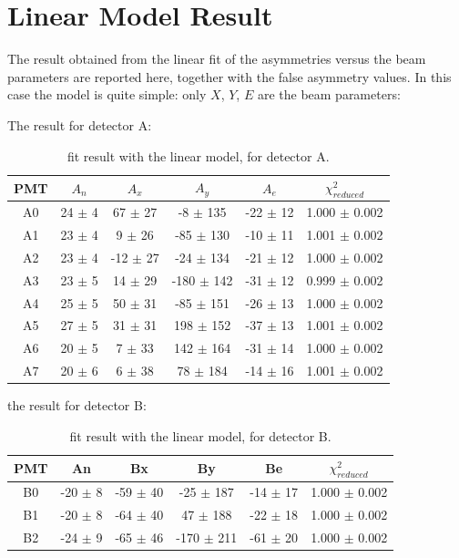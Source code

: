 \newpage
\section{Linear Model Result}
The result obtained from the linear fit of the asymmetries versus the beam parameters are reported here, together with the false asymmetry values. In this case the model is quite simple: only $X$, $Y$, $E$ are the beam parameters:

The result for detector A:
\begin{table}[h] 
\centering
\begin{tabular}{c|c|c|c|c|c}
\hline
 PMT   & $A_{n}$    & $A_{x}$          & $A_{y}$            & $A_{e}$         & $\chi^{2}_{reduced}$ \\
\hline
 A0    & 24 $\pm$ 4 & 67 $\pm$ 27  & -8 $\pm$ 135   & -22 $\pm$ 12 & 1.000 $\pm$ 0.002   \\
 A1    & 23 $\pm$ 4 & 9 $\pm$ 26   & -85 $\pm$ 130  & -10 $\pm$ 11 & 1.001 $\pm$ 0.002 \\
 A2    & 23 $\pm$ 4 & -12 $\pm$ 27 & -24 $\pm$ 134  & -21 $\pm$ 12 & 1.000 $\pm$ 0.002   \\
 A3    & 23 $\pm$ 5 & 14 $\pm$ 29  & -180 $\pm$ 142 & -31 $\pm$ 12 & 0.999 $\pm$ 0.002 \\
 A4    & 25 $\pm$ 5 & 50 $\pm$ 31  & -85 $\pm$ 151  & -26 $\pm$ 13 & 1.000 $\pm$ 0.002   \\
 A5    & 27 $\pm$ 5 & 31 $\pm$ 31  & 198 $\pm$ 152  & -37 $\pm$ 13 & 1.001 $\pm$ 0.002 \\
 A6    & 20 $\pm$ 5 & 7 $\pm$ 33   & 142 $\pm$ 164  & -31 $\pm$ 14 & 1.000 $\pm$ 0.002   \\
 A7    & 20 $\pm$ 6 & 6 $\pm$ 38   & 78 $\pm$ 184   & -14 $\pm$ 16 & 1.001 $\pm$ 0.002 \\
\hline
\end{tabular}
\caption{fit result with the linear model, for detector A.}
\label{tb:resultA}
\end{table}

the result for detector B:
\begin{table}[h]
\centering
\begin{tabular}{c|c|c|c|c|c}
\hline
 PMT   & An         & Bx         & By           & Be        & $\chi^{2}_{reduced}$\\
\hline
 B0    & -20 $\pm$ 8 & -59 $\pm$ 40 & -25 $\pm$ 187  & -14 $\pm$ 17  & 1.000 $\pm$ 0.002 \\
 B1    & -20 $\pm$ 8  & -64 $\pm$ 40 & 47 $\pm$ 188    & -22 $\pm$ 18 & 1.000 $\pm$ 0.002 \\
 B2    & -24 $\pm$ 9 & -65 $\pm$ 46 & -170 $\pm$ 211 & -61 $\pm$ 20 & 1.000 $\pm$ 0.002 \\
\hline
\end{tabular}
\caption{fit result with the linear model, for detector B.}
\end{table}

